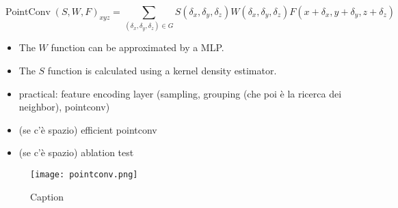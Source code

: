 \begin{equation}
    \operatorname{PointConv} (S, W, F)_{x y z}=
\sum_{\left(\delta_{x}, \delta_{y}, \delta_{z}\right) \in G} S\left(\delta_{x}, \delta_{y}, \delta_{z}\right) W\left(\delta_{x}, \delta_{y}, \delta_{z}\right) F\left(x+\delta_{x}, y+\delta_{y}, z+\delta_{z}\right)
\end{equation}

\begin{itemize}
    \item The $W$ function can be approximated by a MLP.
    \item The $S$ function is calculated using a kernel density estimator.
    \item practical: feature encoding layer (sampling, grouping (che poi è la ricerca dei neighbor), pointconv)
    \item (se c'è spazio) efficient pointconv
    \item (se c'è spazio) ablation test
\end{itemize}

\begin{figure}[h]
    \centering
    \texttt{[image: pointconv.png]}
    \caption{Caption}
    \label{fig:pointconvOperator}
\end{figure}

